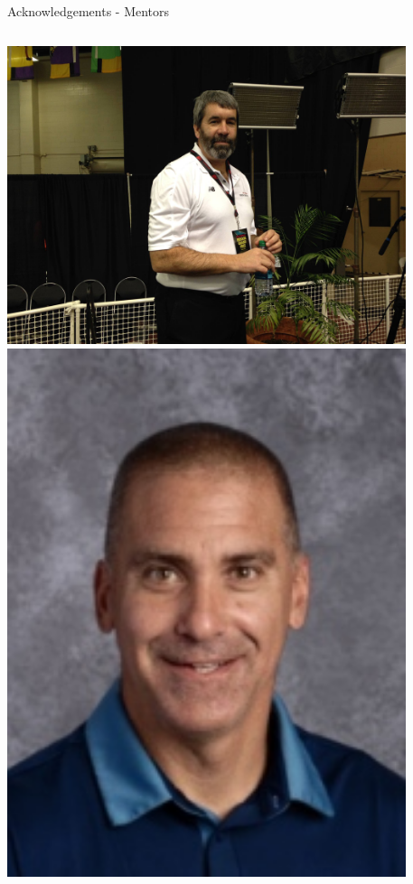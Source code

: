 \documentclass[aspectratio=169]{beamer}
\begin{document}
\begin{frame}{Acknowledgements - Mentors}
\begin{columns}
            \centering
            \includegraphics[width=0.875\textwidth]{people/coaches/pancoast.png}
            \includegraphics[width=0.875\textwidth]{people/coaches/deli.png}   
            \centering

\end{columns}
\end{frame}
\end{document}
